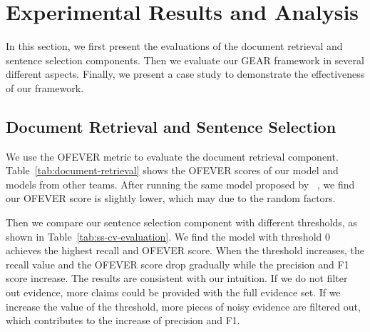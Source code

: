 \documentclass[11pt,a4paper]{article}
\begin{document}
\begin{table}[t]
\begin{center}
\end{center}
\caption{\label{tab:ss-cv-evaluation} Sentence selection evaluation and average label accuracy of GEAR with different thresholds on dev set (\%).}
\end{table}


\section{Experimental Results and Analysis}
In this section, we first present the evaluations of the document retrieval and sentence selection components. Then we evaluate our GEAR framework in several different aspects. Finally, we present a case study to demonstrate the effectiveness of our framework.

\subsection{Document Retrieval and Sentence Selection}
\label{sec:dr-ss-evaluation}
We use the OFEVER metric to evaluate the document retrieval component.
Table~\ref{tab:document-retrieval} shows the OFEVER scores of our model and models from other teams. After running the same model proposed by ~, we find our OFEVER score is slightly lower, which may due to the random factors.

Then we compare our sentence selection component with different thresholds, as shown in Table~\ref{tab:ss-cv-evaluation}. We find the model with threshold 0 achieves the highest recall and OFEVER score. When the threshold increases, the recall value and the OFEVER score drop gradually while the precision and F1 score increase. The results are consistent with our intuition. If we do not filter out evidence, more claims could be provided with the full evidence set. If we increase the value of the threshold, more pieces of noisy evidence are filtered out, which contributes to the increase of precision and F1.
\end{document}
